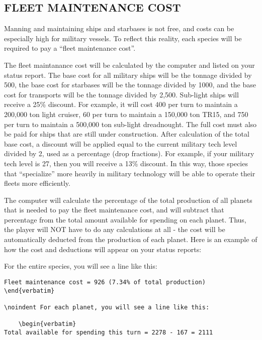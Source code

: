 \documentclass[10pt,titlepage]{article}
\begin{document}
\subsection{FLEET MAINTENANCE COST}
\label{sec:fleetmaintenancecost}


Manning and maintaining ships and starbases is not free, and costs can be
especially high for military vessels.  To reflect this reality, each species
will be required to pay a ``fleet maintenance cost''.

The fleet maintanance cost will be calculated by the computer and listed on
your status report.  The base cost for all military ships will be the tonnage
divided by 500, the base cost for starbases will be the tonnage divided by
1000, and the base cost for transports will be the tonnage divided by 2,500.
Sub-light ships will receive a 25\% discount.  For example, it will cost 400
per turn to maintain a 200,000 ton light cruiser, 60 per turn to maintain a
150,000 ton TR15, and 750 per turn to maintain a 500,000 ton sub-light
dreadnought.  The full cost must also be paid for ships that are still under
construction.  After calculation of the total base cost, a discount will be
applied equal to the current military tech level divided by 2, used as a
percentage (drop fractions).  For example, if your military tech level is 27,
then you will receive a 13\% discount.  In this way, those species that
``specialize'' more heavily in military technology will be able to operate their
fleets more efficiently.

The computer will calculate the percentage of the total production of all
planets that is needed to pay the fleet maintenance cost, and will subtract
that percentage from the total amount available for spending on each planet.
Thus, the player will NOT have to do any calculations at all - the cost will be
automatically deducted from the production of each planet.  Here is an example
of how the cost and deductions will appear on your status reports:

\noindent For the entire species, you will see a line like this:

	\begin{verbatim}
Fleet maintenance cost = 926 (7.34% of total production)	\end{verbatim} 

\noindent For each planet, you will see a line like this:

	\begin{verbatim}
Total available for spending this turn = 2278 - 167 = 2111	\end{verbatim} 
\end{document}
